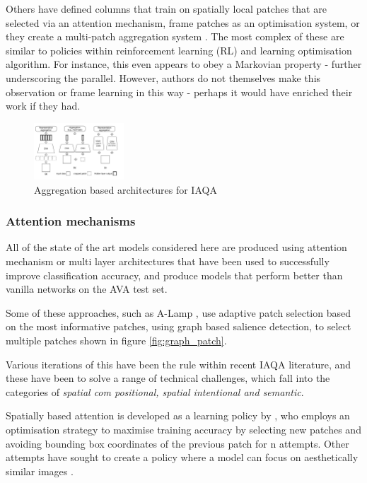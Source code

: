  Others have defined columns that train on spatially local patches that are selected via an attention mechanism, frame patches as an optimisation system, or they create a multi-patch aggregation system \cite{Lu2015b,Sheng2018}. The most complex of these are similar to policies\cite{Sutton2018} within reinforcement learning (RL) and \cite{Sheng2018} learning optimisation algorithm. For instance, this even appears to obey a Markovian property - further underscoring the parallel. However, authors do not themselves make this observation or frame learning in this way - perhaps it would have enriched their work if they had. 

\begin{figure}
    \centering
    \includegraphics[width=0.3\textwidth]{figures/Literature Review/newtworks/Sheng2018_attention_based_MP.png}
    \caption{Aggregation based architectures for IAQA  \cite{Sheng2018}}
    \label{fig:MPADA}
\end{figure}


\subsubsection{Attention mechanisms} 
\label{sec:attention machanisms}

All of the state of the art models considered here are produced using attention mechanism or multi layer architectures that have been used to successfully improve classification accuracy, and produce models that perform better than vanilla networks on the AVA test set. 

Some of these approaches, such as A-Lamp \cite{Ma2017}, use adaptive patch selection based on the most informative patches, using graph based salience detection, to select multiple patches shown in figure \ref{fig:graph_patch}. 

Various iterations of this have been the rule within recent IAQA literature, and these have been to solve a range of technical challenges, which fall into the categories of \textit{spatial com positional, spatial intentional and semantic}. 

Spatially based attention is developed as a learning policy by \cite{Sheng2018}, who employs an optimisation strategy to maximise training accuracy by selecting new patches and avoiding bounding box coordinates of the previous patch for n attempts. Other attempts have sought to create a policy where a model can focus on aesthetically similar images \cite{Schwarz2018a}. 

